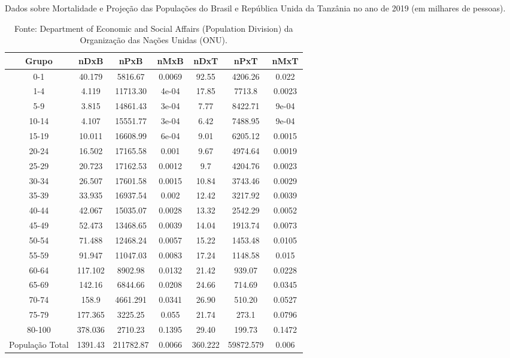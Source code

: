 \begin{table}[H]
  \centering
  \caption{Dados sobre Mortalidade e Projeção das Populações do Brasil e República Unida da Tanzânia no ano de 2019 (em milhares de pessoas).}
  \label{tab:dfBT}
  \begin{tabular}{ccccccc}
    \hline
    Grupo & nDxB & nPxB & nMxB & nDxT & nPxT & nMxT \\
    \hline
    0-1    & 40.179   &  5816.67   & 0.0069 & 92.55  & 4206.26   & 0.022 \\
    1-4    & 4.119    &  11713.30  & 4e-04  & 17.85  & 7713.8    & 0.0023 \\
    5-9    & 3.815    &  14861.43  & 3e-04  & 7.77   & 8422.71   & 9e-04 \\
    10-14  & 4.107    &  15551.77  & 3e-04  & 6.42   & 7488.95   & 9e-04 \\[4pt]
    15-19  & 10.011   &  16608.99  & 6e-04  & 9.01   & 6205.12   & 0.0015 \\
    20-24  & 16.502   &  17165.58  & 0.001  & 9.67   & 4974.64   & 0.0019 \\
    25-29  & 20.723   &  17162.53  & 0.0012 & 9.7    & 4204.76   & 0.0023 \\
    30-34  & 26.507   &  17601.58  & 0.0015 & 10.84  & 3743.46   & 0.0029 \\[4pt]
    35-39  & 33.935   &  16937.54  & 0.002  & 12.42  & 3217.92   & 0.0039 \\
    40-44  & 42.067   &  15035.07  & 0.0028 & 13.32  & 2542.29   & 0.0052 \\
    45-49  & 52.473   &  13468.65  & 0.0039 & 14.04  & 1913.74   & 0.0073 \\
    50-54  & 71.488   &  12468.24  & 0.0057 & 15.22  & 1453.48   & 0.0105 \\[4pt]
    55-59  & 91.947   &  11047.03  & 0.0083 & 17.24  & 1148.58   & 0.015 \\
    60-64  & 117.102  &  8902.98   & 0.0132 & 21.42  & 939.07    & 0.0228 \\
    65-69  & 142.16   &  6844.66   & 0.0208 & 24.66  & 714.69    & 0.0345 \\
    70-74  & 158.9    &  4661.291  & 0.0341 & 26.90  & 510.20    & 0.0527 \\[4pt]
    75-79  & 177.365  &  3225.25   & 0.055  & 21.74  & 273.1     & 0.0796 \\
    80-100 & 378.036  &  2710.23   & 0.1395 & 29.40  & 199.73    & 0.1472 \\
    População Total   &  1391.43   & 211782.87 & 0.0066 & 360.222 & 59872.579 & 0.006 \\
    \hline
  \end{tabular}
  \caption*{Fonte: Department of Economic and Social Affairs (Population Division) da Organização das Nações Unidas (ONU).}
\end{table}

